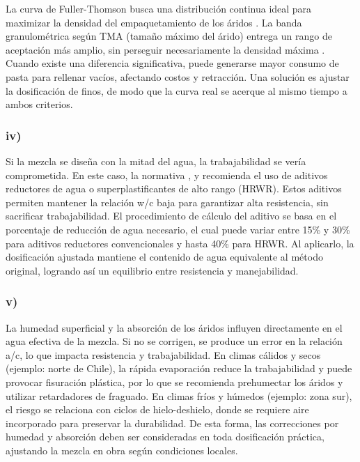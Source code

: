 La curva de Fuller-Thomson busca una distribución continua ideal para maximizar la densidad del empaquetamiento de los áridos \cite{Vidal2025FullerThompson}. La banda granulométrica según TMA (tamaño máximo del árido) entrega un rango de aceptación más amplio, sin perseguir necesariamente la densidad máxima \cite{NCh1632013}. Cuando existe una diferencia significativa, puede generarse mayor consumo de pasta para rellenar vacíos, afectando costos y retracción. Una solución es ajustar la dosificación de finos, de modo que la curva real se acerque al mismo tiempo a ambos criterios.

\subsubsection*{iv)}

Si la mezcla se diseña con la mitad del agua, la trabajabilidad se vería comprometida. En este caso, la normativa \cite{ACI211_2022}, \cite{ACI301_2020} y \cite{NCh1632013} recomienda el uso de aditivos reductores de agua o superplastificantes de alto rango (HRWR). Estos aditivos permiten mantener la relación w/c baja para garantizar alta resistencia, sin sacrificar trabajabilidad. El procedimiento de cálculo del aditivo se basa en el porcentaje de reducción de agua necesario, el cual puede variar entre 15\% y 30\% para aditivos reductores convencionales y hasta 40\% para HRWR. Al aplicarlo, la dosificación ajustada mantiene el contenido de agua equivalente al método original, logrando así un equilibrio entre resistencia y manejabilidad.

\subsubsection*{v)}

La humedad superficial y la absorción de los áridos influyen directamente en el agua efectiva de la mezcla. Si no se corrigen, se produce un error en la relación a/c, lo que impacta resistencia y trabajabilidad. En climas cálidos y secos (ejemplo: norte de Chile), la rápida evaporación reduce la trabajabilidad y puede provocar fisuración plástica, por lo que se recomienda prehumectar los áridos y utilizar retardadores de fraguado. En climas fríos y húmedos (ejemplo: zona sur), el riesgo se relaciona con ciclos de hielo-deshielo, donde se requiere aire incorporado para preservar la durabilidad. De esta forma, las correcciones por humedad y absorción deben ser consideradas en toda dosificación práctica, ajustando la mezcla en obra según condiciones locales.


